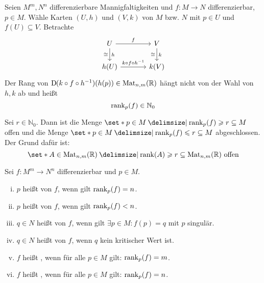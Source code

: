 \begin{definition}[{name=[Rang einer differenzierbaren Abbildung]}]
	Seien $M^m,N^n$ differenzierbare Mannigfaltigkeiten und $f \colon M \to N$ differenzierbar, $p \in M$.
	Wähle Karten $(U,h)$ und $(V,k)$ von $M$ bzw. $N$ mit $p \in U$ und $f(U) \subseteq V$.
	Betrachte 
	\[
		\begin{tikzcd}[column sep=large]
			U \dar["h","\cong"'] \rar["f"] & V \dar["k","\cong"']\\
			h(U) \rar["k \circ f \circ h^{-1}"] & k(V)
		\end{tikzcd}
	\]
	Der Rang von $\mathrm{D}\mkern-1.0mu(k \circ f \circ h^{-1})(h(p)) \in \operatorname{Mat}_{n,m}(\mathbb{R})$ hängt nicht von der Wahl von $h,k$ ab und heißt
	\[
		\operatorname{rank}_p(f) \in \mathbb{N}_0
	\]
\end{definition}

\begin{bemerkung}
	Sei $r \in \mathbb{N}_0$.
	Dann ist die Menge $\set*{p \in M \given \rank_p(f) \ge r} \subseteq M$ offen und die Menge $\set*{p \in M \given \rank_p (f) \le r} \subseteq M$ abgeschlossen.
	Der Grund dafür ist: 
	\[
		\set*{A \in \Mat_{n,m}(\mathbb{R}) \given \rank (A) \ge r} \subseteq \Mat_{n,m}(\mathbb{R}) \text{ offen} 
	\]
\end{bemerkung}

\begin{definition}[{name=[{reguläre Punkte/Werte, singuläre Punkte, kritische Werte}]}]
	Sei $f \colon M^m \to N^n$ differenzierbar und $p \in M$.
	\begin{enumerate}[(i)]
		\item $p$ heißt  von $f$, wenn gilt $\operatorname{rank}_p(f) = n$.
		\item $p$ heißt  von $f$, wenn gilt $\operatorname{rank}_p(f) < n$.
		\item $q \in N$ heißt  von $f$, wenn gilt $\exists p \in M  : f(p)=q$ mit $p$ singulär.
		\item $q \in N$ heißt  von $f$, wenn $q$ kein kritischer Wert ist.
		\item $f$ heißt , wenn für alle $p \in M$ gilt: $\operatorname{rank}_p (f) = m$.
		\item $f$ heißt , wenn für alle $p \in M$ gilt: $\operatorname{rank}_p(f)=n$.  
	\end{enumerate}
\end{definition}

